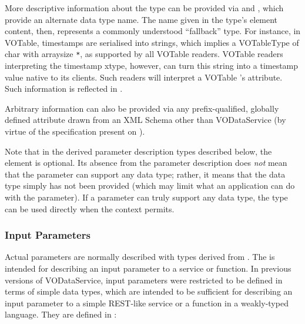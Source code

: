 \documentclass[11pt,a4paper]{ivoa}
\begin{document}
More descriptive information about the type can be provided via
 and , which
provide an alternate data type name.  The name
given in the type's element content, then, represents a commonly
understood “fallback” type.  For instance, in VOTable, timestamps are
serialised into strings, which implies a VOTableType of char with
arraysize \verb|*|, as supported by all VOTable readers.  VOTable readers
interpreting the timestamp xtype, however, can turn this string into a
timestamp value native to its clients.  Such readers will interpret
a VOTable 's  attribute. 
Such information is reflected in .  

Arbitrary information can also be
provided via any prefix-qualified, globally defined attribute drawn
from an XML Schema other than VODataService (by virtue of the
 specification present
on ).





Note that in the derived parameter description types described below,
the  element is optional.  Its absence
from the parameter description does \emph{not} mean that the
parameter can support any data type; rather, it means that the data
type simply has not been provided (which may limit what an application
can do with the parameter).  If a parameter can truly support any data
type, the  type can be used directly when the
context permits.  


\subsubsection{Input Parameters}
\label{sect:inputparam}


Actual parameters are normally described with types derived from
.  The  is intended
for describing an input parameter to a service or function.  In previous
versions of VODataService, input parameters were restricted to be defined
in terms of simple data types, which are intended to be
sufficient for describing an input parameter to a simple REST-like
service or a function in a weakly-typed language.  They are defined
in :
\end{document}

